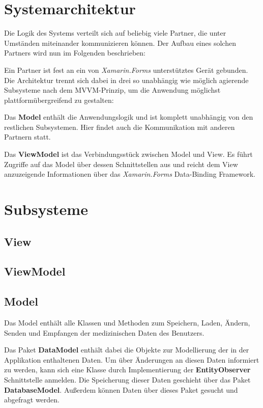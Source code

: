\documentclass[a4paper]{scrreprt}
\begin{document}
\section{Systemarchitektur}
Die Logik des Systems verteilt sich auf beliebig viele Partner, die unter Umständen miteinander kommunizieren können. Der Aufbau eines solchen Partners wird nun im Folgenden beschrieben:

Ein Partner ist fest an ein von \textit{Xamarin.Forms} unterstütztes Gerät gebunden. Die Architektur trennt sich dabei in drei so unabhängig wie möglich agierende Subsysteme nach dem MVVM-Prinzip, um die Anwendung möglichst plattformübergreifend zu gestalten:

Das \textbf{Model} enthält die Anwendungslogik und ist komplett unabhängig von den restlichen Subsystemen. Hier findet auch die Kommunikation mit anderen Partnern statt.


Das \textbf{ViewModel} ist das Verbindungsstück zwischen Model und View. Es führt Zugriffe auf das Model über dessen Schnittstellen aus und reicht dem View anzuzeigende Informationen über das \textit{Xamarin.Forms} Data-Binding Framework.

\section{Subsysteme}
\subsection{View}
\subsection{ViewModel}
\subsection{Model}
Das Model enthält alle Klassen und Methoden zum Speichern, Laden, Ändern, Senden und Empfangen der medizinischen Daten des Benutzers. 

Das Paket \textbf{DataModel} enthält dabei die Objekte zur Modellierung der in der Applikation enthaltenen Daten. Um über Änderungen an diesen Daten informiert zu werden, kann sich eine Klasse durch Implementierung der \textbf{EntityObserver} Schnittstelle anmelden.
Die Speicherung dieser Daten geschieht über das Paket \textbf{DatabaseModel}. Außerdem 
können Daten über dieses Paket gesucht und abgefragt werden.
\end{document}
